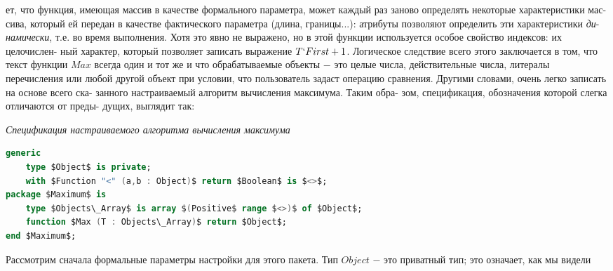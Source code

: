 \documentclass{./git_rep/mai_prac_2017/template/mai_book}
\begin{document}
\noindent
ет, что функция, имеющая массив в качестве формального параметра,\linebreak
может каждый раз заново определять некоторые характеристики мас-\linebreak
сива,  который ей  передан  в качестве фактического параметра (длина,\linebreak
границы...):  атрибуты позволяют определить эти характеристики \textit{ди}-\linebreak
\textit{намически}, т.е. во время выполнения. Хотя это явно не выражено, но в\linebreak
этой  функции  используется  особое  свойство  индексов:  их  целочислен-\linebreak
ный характер, который позволяет записать выражение $T`First+1$.\newline
\hspace*{15pt}Логическое  следствие  всего  этого  заключается  в  том,  что  текст\linebreak
функции $Max$ всегда один и тот же и что обрабатываемые объекты $-$\linebreak
это  целые  числа,  действительные  числа,  литералы  перечисления  или\linebreak
любой другой объект при условии,  что пользователь задаст операцию\linebreak
сравнения. Другими словами, очень легко записать на основе всего ска-\linebreak
занного настраиваемый алгоритм вычисления максимума. Таким обра-\linebreak
зом, спецификация, обозначения которой слегка отличаются от преды-\linebreak
дущих, выглядит так:
\begin{center}
\textit{Спецификация настраиваемого алгоритма вычисления максимума}
\end{center}
\begin{lstlisting}[mathescape=true, language=Ada]
generic
    type $Object$ is private;
    with $Function "<" (a,b : Object)$ return $Boolean$ is $<>$;
package $Maximum$ is
    type $Objects\_Array$ is array $(Positive$ range $<>)$ of $Object$;
    function $Max (T : Objects\_Array)$ return $Object$;
end $Maximum$;
\end{lstlisting}
\hspace*{15pt}Рассмотрим сначала формальные  параметры  настройки  для этого\linebreak
пакета. Тип $Object$ $-$ это приватный тип; это означает, как мы видели\linebreak
\end{document}
